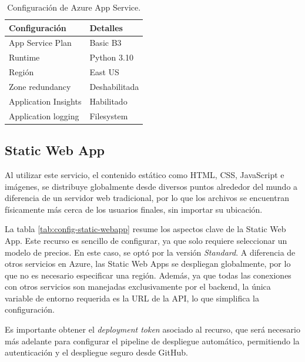 \begin{table}[h]
	\centering
	\caption[Configuración de Azure App Service]{Configuración de Azure App Service.}
	\begin{tabular}{l l}    
		\toprule
		\textbf{Configuración} & \textbf{Detalles} 	\\
		\midrule
		App Service Plan       & Basic B3           \\
		Runtime                & Python 3.10        \\
		Región                 & East US 			\\		
		Zone redundancy        & Deshabilitada		\\
		Application Insights   & Habilitado         \\
		Application logging	   & Filesystem			\\
		\bottomrule
		\hline
	\end{tabular}
	\label{tab:config-app-service}
\end{table}

\subsection{Static Web App}

Al utilizar este servicio, el contenido estático como HTML, CSS, JavaScript e imágenes, se distribuye globalmente desde diversos puntos 
alrededor del mundo a diferencia de un servidor web tradicional, por lo que los archivos se encuentran físicamente más cerca de los usuarios finales,
sin importar su ubicación.

La tabla \ref{tab:config-static-webapp} resume los aspectos clave de la Static Web App. Este recurso es sencillo de configurar, ya que solo requiere seleccionar un modelo de precios. En este caso, se optó por 
la versión \textit{Standard}. A diferencia de otros servicios en Azure, las Static Web Apps se despliegan globalmente, por lo que no es necesario especificar una región. 
Además, ya que todas las conexiones con otros servicios son manejadas exclusivamente por el backend, la única variable de entorno requerida 
es la URL de la API, lo que simplifica la configuración.

Es importante obtener el \textit{deployment token} asociado al recurso, que será necesario más adelante para configurar el pipeline de despliegue automático, 
permitiendo la autenticación y el despliegue seguro desde GitHub.

